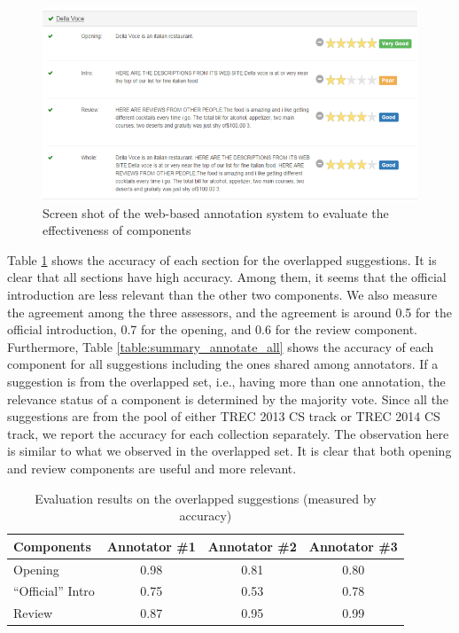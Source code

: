 \begin{figure}[t]
  \centering
  \includegraphics{figures/summary_judge_scrnshot.eps}
  \caption{Screen shot of the web-based annotation system to evaluate the effectiveness of components}
  \label{fig:summary_judge_scrnshot}
\end{figure}


Table \ref{table:summary_annotate_overlapped} shows the accuracy of 
each section for the overlapped suggestions. It is clear that all 
sections have high accuracy. Among them, it seems that the official 
introduction are less relevant than the other two components. 
We also measure the agreement among the three assessors, and the 
agreement is around 0.5 for the official introduction, 0.7 for 
the opening, and 0.6 for the review component. 
Furthermore, Table \ref{table:summary_annotate_all} shows the accuracy 
of each component for all suggestions including the ones shared 
among annotators. If a suggestion is from the overlapped set, i.e., 
having more than one annotation, the relevance status of a component 
is determined by the majority vote.  Since all the suggestions 
are from the pool of either TREC 2013 CS track or TREC 2014 CS track, 
we report the accuracy for each collection separately. 
The observation here is similar to what we observed in the overlapped set. 
It is clear that both opening and review components are useful and more 
relevant. 


\begin{table}[t]
\centering
\caption{Evaluation results on the overlapped suggestions (measured by accuracy)} 
\label{table:summary_annotate_overlapped}
\begin{tabular}
{ |l|c|c|c| }
\hline
Components & Annotator \#1 & Annotator \#2 & Annotator \#3 \\ \hline
Opening & 0.98 & 0.81 & 0.80 \\ \hline
``Official'' Intro & 0.75 & 0.53 & 0.78 \\ \hline
Review & 0.87 & 0.95 & 0.99 \\ \hline

\hline

\end{tabular}
\end{table}

